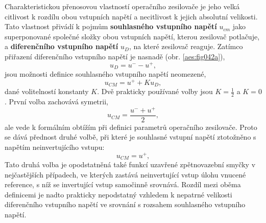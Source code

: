       Charakteristickou přenosovou vlastností operačního zesilovače je jeho velká citlivost k
      rozdílu obou vstupních napětí a necitlivost k jejich absolutní velikosti. Tato vlastnost
      přivádí k pojmům \textbf{souhlasného vstupního napětí} \(u_{cm}\) jako superponované společné
      složky obou vstupních napětí, kterou zesilovač potlačuje, a \textbf{diferenčního vstupního
      napětí} \(u_D\), na které zesilovač reaguje. Zatímco přiřazení diferenčního vstupního napětí
      je nasnadě (obr. \ref{aes:fig042a}),
      \begin{equation}\label{aes:eq026}
        u_D = u^- - u^+,
      \end{equation}
      jsou možnosti definice souhlasného vstupního  napětí neomezené, 
      \begin{equation}\label{aes:eq027}
        u_{CM} = u^+ + Ku_D,
      \end{equation}
      dané volitelností konstanty \(K\). Dvě prakticky používané volby jsou \(K=\frac{1}{2}\) a
      \(K=0\). První volba zachovává symetrii, 
      \begin{equation*}
        u_{CM} = \dfrac{u^- + u^+}{2},
      \end{equation*}
      ale vede k formálním obtížím při definici parametrů operačního zesilovače. Proto se dává
      přednost druhé volbě, při které je souhlasné vstupní napětí ztotožněno s napětím
      neinvertujícího vstupu: 
      \begin{equation*}
        u_{CM} = u^+,
      \end{equation*}
      Tato druhá volba je opodstatněná také funkcí uzavřené zpětnovazební smyčky v nejčastějších
      případech, ve kterých zastává neinvertující vstup úlohu vnucené reference, s níž se
      invertující vstup samočinně srovnává. Rozdíl mezi oběma definicemi je nadto prakticky
      nepodstatný vzhledem k nepatrné velikosti diferenčního vstupního napětí ve srovnání s rozsahem
      souhlasného vstupního napětí. 

      
    
